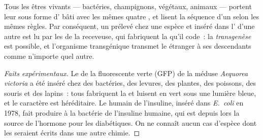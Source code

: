 \begin{proposition}\label{prop:g10:universal-dna:universal}
Tous les êtres vivants --- bactéries, champignons, végétaux, animaux
--- portent leur  sous forme d' bâti avec les
mêmes quatre , et lisent la séquence d'un  selon les
mêmes règles. Par conséquent, un  prélevé chez une espèce et
inséré dans l' d'une autre est lu par les  de la receveuse,
qui fabriquent la  qu'il code~: la
\emph{transgenèse} est possible, et l'organisme
transgénique transmet le  étranger à ses descendants comme
n'importe quel autre.
\end{proposition}
\begin{proof}[Faits expérimentaux]
Le  de la  fluorescente verte (GFP) de la méduse
\emph{Aequorea victoria} a été inséré chez des bactéries, des levures,
des plantes, des poissons, des souris et des lapins~: tous fabriquent
la  et luisent en vert sous une lumière bleue, et le caractère
est héréditaire. Le  humain de l'insuline, inséré dans
\emph{E.~coli} en 1978, fait produire à la bactérie de l'insuline
humaine, qui est depuis lors la source de l'hormone pour les
diabétiques. On ne connaît aucun cas d'espèce dont les  seraient
écrits dans une autre chimie.
\end{proof}

